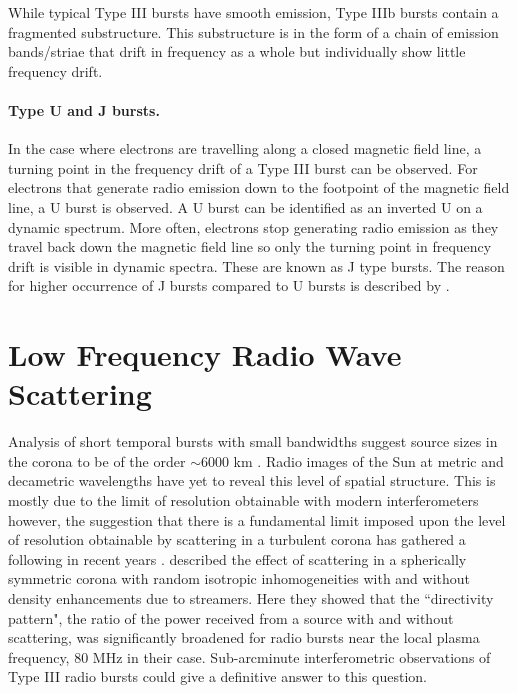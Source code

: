 While typical Type III bursts have smooth emission, Type IIIb bursts contain a fragmented substructure. This substructure is in the form of a chain of emission bands/striae that drift in frequency as a whole but individually show little frequency drift.

\paragraph{Type U and J bursts.}

In the case where electrons are travelling along a closed magnetic field line, a turning point in the frequency drift of a Type III burst can be observed. For electrons that generate radio emission down to the footpoint of the magnetic field line, a U burst is observed. A U burst can be identified as an inverted U on a dynamic spectrum. More often, electrons stop generating radio emission as they travel back down the magnetic field line so only the turning point in frequency drift is visible in dynamic spectra. These are known as J type bursts. The reason for higher occurrence of J bursts compared to U bursts is described by \cite{Reid2017}.

\section{Low Frequency Radio Wave Scattering}

Analysis of short temporal bursts with small bandwidths suggest source sizes in the corona to be of the order $\sim 6000$ km \citep{McConnell1980}. Radio images of the Sun at metric and decametric wavelengths have yet to reveal this level of spatial structure. This is mostly due to the limit of resolution obtainable with modern interferometers however, the suggestion that there is a fundamental limit imposed upon the level of resolution obtainable by scattering in a turbulent corona \citep{Bastian1994} has gathered a following in recent years \citep{Kontar2017}. \cite{Riddle1974} described the effect of scattering in a spherically symmetric corona with random isotropic inhomogeneities with and without density enhancements due to streamers. Here they showed that the ``directivity pattern", the ratio of the power received from a source with and without scattering, was significantly broadened for radio bursts near the local plasma frequency, 80 MHz in their case.
Sub-arcminute interferometric observations of Type III radio bursts could give a definitive answer to this question.



